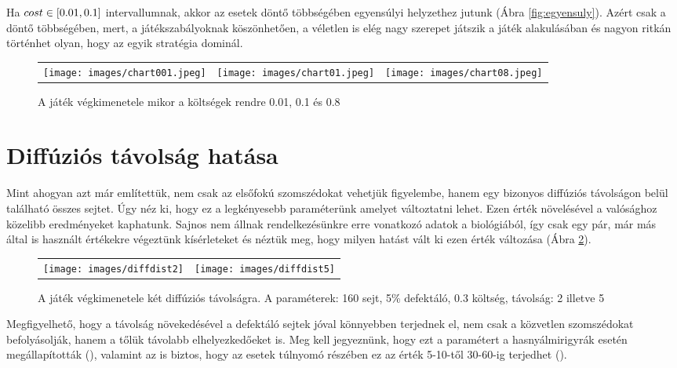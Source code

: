 Ha $cost \in\interval{0.01}{0.1}$ intervallumnak, akkor az esetek döntő többségében egyensúlyi helyzethez jutunk (Ábra \ref{fig:egyensuly}). Azért csak a döntő többségében, mert, a játékszabályoknak köszönhetően, a véletlen is elég nagy szerepet játszik a játék alakulásában és nagyon ritkán történhet olyan, hogy az egyik stratégia dominál.

\begin{figure}[ht!]
	\centering
	\begin{tabular}{ccc}
		\texttt{[image: images/chart001.jpeg]}
		&
		\texttt{[image: images/chart01.jpeg]}
		&
		\texttt{[image: images/chart08.jpeg]}
	\end{tabular}
	\caption{A játék végkimenetele mikor a költségek rendre 0.01, 0.1 és 0.8}
	\label{fig:CoopCostChange}
\end{figure}


\section{Diffúziós távolság hatása}

Mint ahogyan azt már említettük, nem csak az elsőfokú szomszédokat vehetjük figyelembe, hanem egy bizonyos diffúziós távolságon belül található összes sejtet. Úgy néz ki, hogy ez a legkényesebb paraméterünk amelyet változtatni lehet. Ezen érték növelésével a valósághoz közelibb eredményeket kaphatunk. Sajnos nem állnak rendelkezésünkre erre vonatkozó adatok a biológiából, így csak egy pár, már más által is használt értékekre végeztünk kísérleteket és néztük meg, hogy milyen hatást vált ki ezen érték változása (Ábra \ref{fig:DiffDist}). 

\begin{figure}[ht!]
	\centering
	\captionsetup{justification=centering}
	\begin{tabular}{cc}
		\texttt{[image: images/diffdist2]}
		&
		\texttt{[image: images/diffdist5]}
	\end{tabular}
	\caption{A játék végkimenetele két diffúziós távolságra. A paraméterek: 160 sejt, 5\% defektáló, 0.3 költség, távolság: 2 illetve 5}
	\label{fig:DiffDist}
\end{figure}

Megfigyelhető, hogy a távolság növekedésével a defektáló sejtek jóval könnyebben terjednek el, nem csak a közvetlen szomszédokat befolyásolják, hanem a tőlük távolabb elhelyezkedőeket is. Meg kell jegyeznünk, hogy ezt a paramétert a hasnyálmirigyrák esetén megállapították (\cite{archetti2015heterogeneity}), valamint az is biztos, hogy az esetek túlnyomó részében ez az érték 5-10-től 30-60-ig terjedhet (\cite{archetti2016cooperation}).

